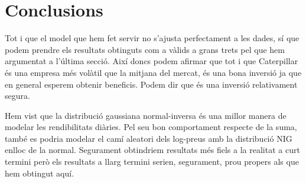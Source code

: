 \documentclass{article}
\numberwithin{table}{section}
\numberwithin{figure}{section}
\numberwithin{equation}{section}
\begin{document}
\section{Conclusions}
Tot i que el model que hem fet servir no s'ajusta perfectament a les dades, sí que podem prendre els resultats obtinguts com a vàlids a grans trets pel que hem argumentat a l'última secció. Així doncs podem afirmar que tot i que Caterpillar és una empresa més volàtil que la mitjana del mercat, és una bona inversió ja que en general esperem obtenir beneficis. Podem dir que és una inversió relativament segura. 

Hem vist que la distribució gaussiana normal-inversa és una millor manera de modelar les rendibilitats diàries. Pel seu bon comportament respecte de la suma, també es podria modelar el camí aleatori dels log-preus amb la distribució NIG enlloc de la normal. Segurament obtindriem resultats més fiels a la realitat a curt termini però els resultats a llarg termini serien, segurament, prou propers als que hem obtingut aquí.

\printbibliography[heading = biblio]
\end{document}

